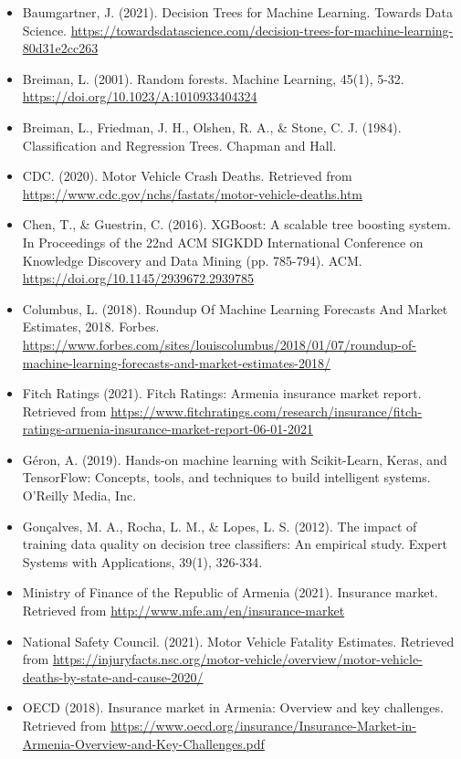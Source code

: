 \documentclass{IEEEtran}
\begin{document}
\begin{itemize}

\item Baumgartner, J. (2021). Decision Trees for Machine Learning. Towards Data Science. \url{https://towardsdatascience.com/decision-trees-for-machine-learning-80d31e2cc263}
 \item Breiman, L. (2001). Random forests. Machine Learning, 45(1), 5-32. \url{https://doi.org/10.1023/A:1010933404324}
\item Breiman, L., Friedman, J. H., Olshen, R. A., \& Stone, C. J. (1984). Classification and Regression Trees. Chapman and Hall.
\item CDC. (2020). Motor Vehicle Crash Deaths. Retrieved from \url{https://www.cdc.gov/nchs/fastats/motor-vehicle-deaths.htm}
 \item Chen, T., \& Guestrin, C. (2016). XGBoost: A scalable tree boosting system. In Proceedings of the 22nd ACM SIGKDD International Conference on Knowledge Discovery and Data Mining (pp. 785-794). ACM. \url{https://doi.org/10.1145/2939672.2939785}
\item Columbus, L. (2018). Roundup Of Machine Learning Forecasts And Market Estimates, 2018. Forbes. \url{https://www.forbes.com/sites/louiscolumbus/2018/01/07/roundup-of-machine-learning-forecasts-and-market-estimates-2018/}
\item Fitch Ratings (2021). Fitch Ratings: Armenia insurance market report. Retrieved from \url{https://www.fitchratings.com/research/insurance/fitch-ratings-armenia-insurance-market-report-06-01-2021}
\item Géron, A. (2019). Hands-on machine learning with Scikit-Learn, Keras, and TensorFlow: Concepts, tools, and techniques to build intelligent systems. O'Reilly Media, Inc.
\item Gonçalves, M. A., Rocha, L. M., \& Lopes, L. S. (2012). The impact of training data quality on decision tree classifiers: An empirical study. Expert Systems with Applications, 39(1), 326-334.
\item Ministry of Finance of the Republic of Armenia (2021). Insurance market. Retrieved from \url{http://www.mfe.am/en/insurance-market}
\item National Safety Council. (2021). Motor Vehicle Fatality Estimates. Retrieved from \url{https://injuryfacts.nsc.org/motor-vehicle/overview/motor-vehicle-deaths-by-state-and-cause-2020/}
\item OECD (2018). Insurance market in Armenia: Overview and key challenges. Retrieved from \url{https://www.oecd.org/insurance/Insurance-Market-in-Armenia-Overview-and-Key-Challenges.pdf}

\end{itemize}
\end{document}
